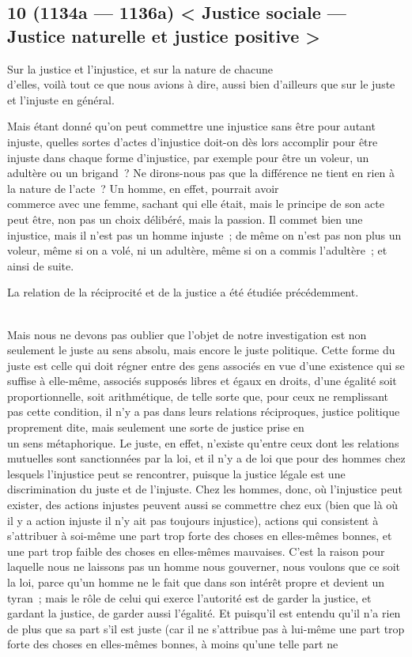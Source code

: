 \documentclass[french,twoside]{book} %
\begin{document}
\subsection[{10 (1134a — 1136a) < Justice sociale — Justice naturelle et justice positive >}]{10 (1134a — 1136a) < Justice sociale — Justice naturelle et justice positive >}
\noindent Sur la justice et l’injustice, et sur la nature de chacune \\
d’elles, voilà tout ce que nous avions à dire, aussi bien d’ailleurs que sur le juste et l’injuste en général.\par
Mais étant donné qu’on peut commettre une injustice sans être pour autant injuste, quelles sortes d’actes d’injustice doit-on dès lors accomplir pour être injuste dans chaque forme d’injustice, par exemple pour être un voleur, un adultère ou un brigand ? Ne dirons-nous pas que la différence ne tient en rien à la nature de l’acte ? Un homme, en effet, pourrait avoir \\
commerce avec une femme, sachant qui elle était, mais le principe de son acte peut être, non pas un choix délibéré, mais la passion. Il commet bien une injustice, mais il n’est pas un homme injuste ; de même on n’est pas non plus un voleur, même si on a volé, ni un adultère, même si on a commis l’adultère ; et ainsi de suite.\par
La relation de la réciprocité et de la justice a été étudiée précédemment.\par
\\
Mais nous ne devons pas oublier que l’objet de notre investigation est non seulement le juste au sens absolu, mais encore le juste politique. Cette forme du juste est celle qui doit régner entre des gens associés en vue d’une existence qui se suffise à elle-même, associés supposés libres et égaux en droits, d’une égalité soit proportionnelle, soit arithmétique, de telle sorte que, pour ceux ne remplissant pas cette condition, il n’y a pas dans leurs relations réciproques, justice politique proprement dite, mais seulement une sorte de justice prise en \\
un sens métaphorique. Le juste, en effet, n’existe qu’entre ceux dont les relations mutuelles sont sanctionnées par la loi, et il n’y a de loi que pour des hommes chez lesquels l’injustice peut se rencontrer, puisque la justice légale est une discrimination du juste et de l’injuste. Chez les hommes, donc, où l’injustice peut exister, des actions injustes peuvent aussi se commettre chez eux (bien que là où il y a action injuste il n’y ait pas toujours injustice), actions qui consistent à s’attribuer à soi-même une part trop forte des choses en elles-mêmes bonnes, et une part trop faible des choses en elles-mêmes mauvaises. C’est la raison pour laquelle nous ne laissons pas un homme nous gouverner, nous voulons que ce soit la loi, parce qu’un  homme ne le fait que dans son intérêt propre et devient un tyran ; mais le rôle de celui qui exerce l’autorité est de garder la justice, et gardant la justice, de garder aussi l’égalité. Et puisqu’il est entendu qu’il n’a rien de plus que sa part s’il est juste (car il ne s’attribue pas à lui-même une part trop forte des choses en elles-mêmes bonnes, à moins qu’une telle part ne \\
\end{document}
